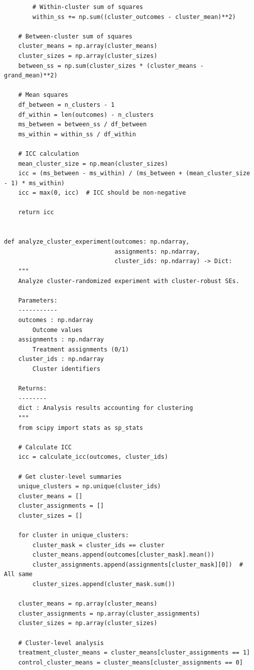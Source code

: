 \begin{lstlisting}
        # Within-cluster sum of squares
        within_ss += np.sum((cluster_outcomes - cluster_mean)**2)

    # Between-cluster sum of squares
    cluster_means = np.array(cluster_means)
    cluster_sizes = np.array(cluster_sizes)
    between_ss = np.sum(cluster_sizes * (cluster_means - grand_mean)**2)

    # Mean squares
    df_between = n_clusters - 1
    df_within = len(outcomes) - n_clusters
    ms_between = between_ss / df_between
    ms_within = within_ss / df_within

    # ICC calculation
    mean_cluster_size = np.mean(cluster_sizes)
    icc = (ms_between - ms_within) / (ms_between + (mean_cluster_size - 1) * ms_within)
    icc = max(0, icc)  # ICC should be non-negative

    return icc


def analyze_cluster_experiment(outcomes: np.ndarray,
                               assignments: np.ndarray,
                               cluster_ids: np.ndarray) -> Dict:
    """
    Analyze cluster-randomized experiment with cluster-robust SEs.

    Parameters:
    -----------
    outcomes : np.ndarray
        Outcome values
    assignments : np.ndarray
        Treatment assignments (0/1)
    cluster_ids : np.ndarray
        Cluster identifiers

    Returns:
    --------
    dict : Analysis results accounting for clustering
    """
    from scipy import stats as sp_stats

    # Calculate ICC
    icc = calculate_icc(outcomes, cluster_ids)

    # Get cluster-level summaries
    unique_clusters = np.unique(cluster_ids)
    cluster_means = []
    cluster_assignments = []
    cluster_sizes = []

    for cluster in unique_clusters:
        cluster_mask = cluster_ids == cluster
        cluster_means.append(outcomes[cluster_mask].mean())
        cluster_assignments.append(assignments[cluster_mask][0])  # All same
        cluster_sizes.append(cluster_mask.sum())

    cluster_means = np.array(cluster_means)
    cluster_assignments = np.array(cluster_assignments)
    cluster_sizes = np.array(cluster_sizes)

    # Cluster-level analysis
    treatment_cluster_means = cluster_means[cluster_assignments == 1]
    control_cluster_means = cluster_means[cluster_assignments == 0]


\end{lstlisting}
